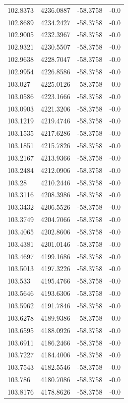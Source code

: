 \begin{table}[H]
\begin{tabular}{llll}
102.8373 & 4236.0887 & -58.3758 & -0.0 \\
102.8689 & 4234.2427 & -58.3758 & -0.0 \\
102.9005 & 4232.3967 & -58.3758 & -0.0 \\
102.9321 & 4230.5507 & -58.3758 & -0.0 \\
102.9638 & 4228.7047 & -58.3758 & -0.0 \\
102.9954 & 4226.8586 & -58.3758 & -0.0 \\
103.027 & 4225.0126 & -58.3758 & -0.0 \\
103.0586 & 4223.1666 & -58.3758 & -0.0 \\
103.0903 & 4221.3206 & -58.3758 & -0.0 \\
103.1219 & 4219.4746 & -58.3758 & -0.0 \\
103.1535 & 4217.6286 & -58.3758 & -0.0 \\
103.1851 & 4215.7826 & -58.3758 & -0.0 \\
103.2167 & 4213.9366 & -58.3758 & -0.0 \\
103.2484 & 4212.0906 & -58.3758 & -0.0 \\
103.28 & 4210.2446 & -58.3758 & -0.0 \\
103.3116 & 4208.3986 & -58.3758 & -0.0 \\
103.3432 & 4206.5526 & -58.3758 & -0.0 \\
103.3749 & 4204.7066 & -58.3758 & -0.0 \\
103.4065 & 4202.8606 & -58.3758 & -0.0 \\
103.4381 & 4201.0146 & -58.3758 & -0.0 \\
103.4697 & 4199.1686 & -58.3758 & -0.0 \\
103.5013 & 4197.3226 & -58.3758 & -0.0 \\
103.533 & 4195.4766 & -58.3758 & -0.0 \\
103.5646 & 4193.6306 & -58.3758 & -0.0 \\
103.5962 & 4191.7846 & -58.3758 & -0.0 \\
103.6278 & 4189.9386 & -58.3758 & -0.0 \\
103.6595 & 4188.0926 & -58.3758 & -0.0 \\
103.6911 & 4186.2466 & -58.3758 & -0.0 \\
103.7227 & 4184.4006 & -58.3758 & -0.0 \\
103.7543 & 4182.5546 & -58.3758 & -0.0 \\
103.786 & 4180.7086 & -58.3758 & -0.0 \\
103.8176 & 4178.8626 & -58.3758 & -0.0 \\

\end{tabular}
\end{table}
